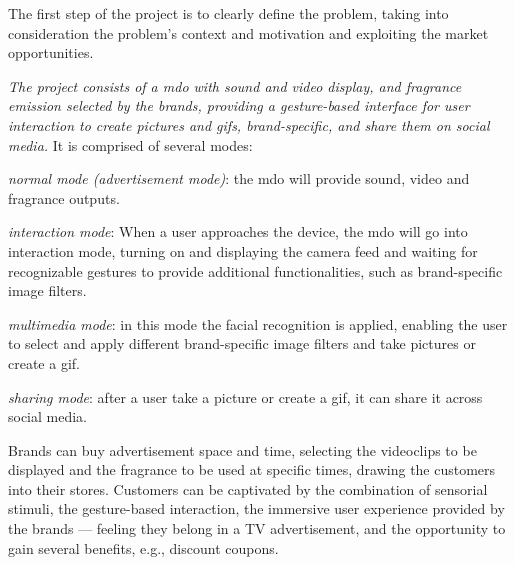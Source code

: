 The first step of the project is to clearly define the problem, taking into
consideration the problem's context and motivation and exploiting the market
opportunities.

\emph{The project consists of a \gls{mdo} with sound and
video display, and fragrance emission selected by the brands, providing a gesture-based interface for
user interaction to create pictures and \gls{gif}s, brand-specific, and share them on
social media.} It is comprised of several modes:
\begin{item-c}
\item \emph{normal mode (advertisement mode)}: the \gls{mdo} will provide
  sound, video and fragrance outputs.
\item \emph{interaction mode}: When a user approaches the device, the \gls{mdo} will
go into interaction mode, turning on and displaying the camera feed and waiting
for recognizable gestures to provide additional functionalities, such as
brand-specific image filters.
\item \emph{multimedia mode}: in this mode the facial recognition is applied,
  enabling the user to select and apply different brand-specific image filters and take pictures or create a \gls{gif}.
\item \emph{sharing mode}: after a user take a picture or create a \gls{gif}, it
  can share it across social media.
\end{item-c}

Brands can buy advertisement space and time, selecting the videoclips to be
displayed and the fragrance to be used at specific times, drawing the customers
into their stores. Customers can be captivated by the combination of sensorial
stimuli, the gesture-based interaction, the immersive user experience provided
by the brands --- feeling they belong in a TV advertisement, and the opportunity
to gain several benefits, e.g., discount coupons.
